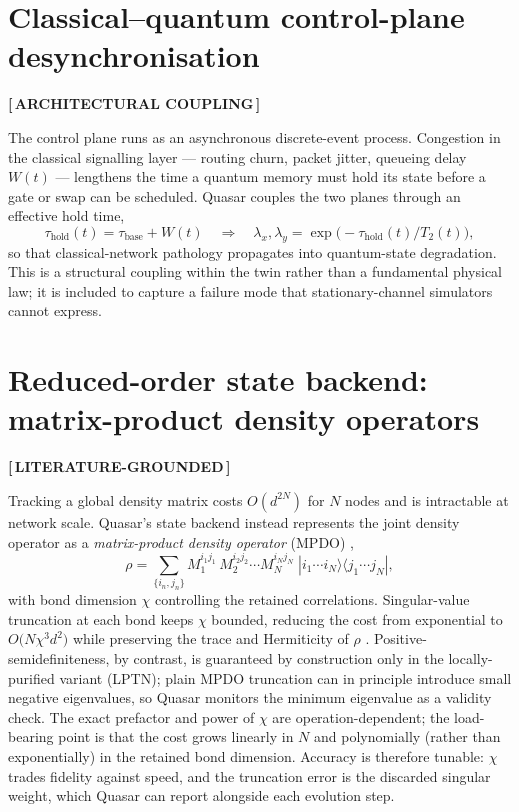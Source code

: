 \documentclass[11pt]{article}
\newcommand{\statusVerified}{\textbf{\color{verified}[\,LITERATURE-GROUNDED\,]}}
\newcommand{\statusArch}{\textbf{\color{architect}[\,ARCHITECTURAL COUPLING\,]}}
\begin{document}
\section{Classical--quantum control-plane desynchronisation}
\statusArch

The control plane runs as an asynchronous discrete-event process. Congestion in the classical
signalling layer --- routing churn, packet jitter, queueing delay $W(t)$ --- lengthens the
time a quantum memory must hold its state before a gate or swap can be scheduled. Quasar
couples the two planes through an effective hold time,
\begin{equation}
\tau_{\mathrm{hold}}(t)=\tau_{\mathrm{base}}+W(t)\quad\Longrightarrow\quad
\lambda_x,\lambda_y=\exp\!\big(-\tau_{\mathrm{hold}}(t)/T_2(t)\big),
\end{equation}
so that classical-network pathology propagates into quantum-state degradation. This is a
structural coupling within the twin rather than a fundamental physical law; it is included to
capture a failure mode that stationary-channel simulators cannot express.

\section{Reduced-order state backend: matrix-product density operators}
\statusVerified

Tracking a global density matrix costs $O(d^{2N})$ for $N$ nodes and is intractable at network
scale. Quasar's state backend instead represents the joint density operator as a
\emph{matrix-product density operator} (MPDO)
\cite{schollwock2011,weimer2021},
\begin{equation}
\rho=\sum_{\{i_n,j_n\}} M_1^{i_1 j_1}\,M_2^{i_2 j_2}\cdots M_N^{i_N j_N}\;
|i_1\cdots i_N\rangle\langle j_1\cdots j_N|,
\end{equation}
with bond dimension $\chi$ controlling the retained correlations. Singular-value truncation at
each bond keeps $\chi$ bounded, reducing the cost from exponential to
$O\!\big(N\chi^3 d^2\big)$ while preserving the trace and Hermiticity of $\rho$
\cite{jarkovsky2020}. Positive-semidefiniteness, by contrast, is guaranteed by construction
only in the locally-purified variant (LPTN); plain MPDO truncation can in principle introduce
small negative eigenvalues, so Quasar monitors the minimum eigenvalue as a validity check. The
exact prefactor and power of $\chi$ are operation-dependent; the
load-bearing point is that the cost grows linearly in $N$ and polynomially (rather than
exponentially) in the retained bond dimension. Accuracy is therefore tunable: $\chi$ trades
fidelity against speed, and the truncation error is the discarded singular weight, which
Quasar can report alongside each evolution step.
\end{document}
